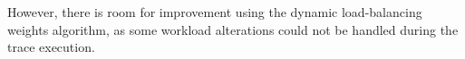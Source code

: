 However, there is room for improvement using the dynamic load-balancing weights algorithm, as some  workload alterations could not be handled during the trace execution.





